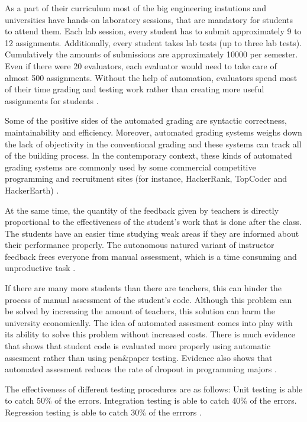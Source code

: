 \documentclass[a4paper, 12pt]{article}
\begin{document}
    As a part of their curriculum most of the big engineering instutions and universities have hands-on laboratory sessions, that are mandatory
    for students to attend them. Each lab session, every student has to submit approximately 9 to 12 assignments. Additionally, every student takes lab tests (up to three lab tests).
    Cumulatively the amounts of submissions are approximately 10000 per semester. Even if there were 20 evaluators, each evaluator would need to take care of almost 500 assignments.
    Without the help of automation, evaluators spend most of their time grading and testing work rather than creating more useful assignments for students \cite{Mandal2007}.

    Some of the positive sides of the automated grading are syntactic correctness, maintainability and efficiency.
    Moreover, automated grading systems weighs down the lack of objectivity in the conventional grading and these systems
    can track all of the building process. In the contemporary context, these kinds of automated grading systems are commonly used by
    some commercial competitive programming and recruitment sites (for instance, HackerRank, TopCoder and HackerEarth) \cite{RestrepoCalle2018}.

    At the same time, the quantity of the feedback given by teachers is directly proportional to the effectiveness of the student's work that is done
    after the class. The students have an easier time studying weak areas if they are informed about their
    performance properly. The autonomous natured variant of instructor feedback frees everyone from manual assessment,
    which is a time consuming and unproductive task \cite{RestrepoCalle2018-2}.

    If there are many more students than there are teachers, this can hinder the process of manual assessment of the student's code.
    Although this problem can be solved by increasing the amount of teachers, this solution can harm the university economically.
    The idea of automated assesment comes into play with its ability to solve this problem without increased costs.
    There is much evidence that shows that student code is evaluated more properly using automatic assesment rather than using pen\&paper testing.
    Evidence also shows that automated assesment reduces the rate of dropout in programming majors \cite{Gordillo2019}.

    The effectiveness of different testing procedures are as follows:
    Unit testing is able to catch 50\% of the errors.
    Integration testing is able to catch 40\% of the errors.
    Regression testing is able to catch 30\% of the errrors \cite{Fenton2018}.
\end{document}
